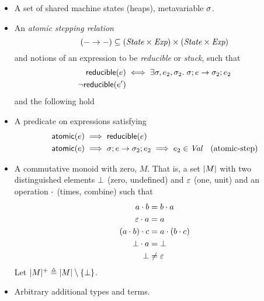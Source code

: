 \begin{itemize}
\item A set  of shared machine states (\eg heaps), metavariable $\sigma$.
\item An \emph{atomic stepping relation} \[
  (- \rightarrow -) \subseteq (\textit{State} \times \textit{Exp}) \times (\textit{State} \times \textit{Exp})
\]
and notions of an expression to be \emph{reducible} or \emph{stuck}, such that
\begin{align*}
  \textlog{reducible}(\expr) &\iff \Exists \state, \expr_2, \state_2. \cfg{\state}{\expr} \step \cfg{\state_2}{\expr_2} \\
   \lnot \textlog{reducible}(\expr')
\end{align*}
and the following hold

\item A predicate  on expressions satisfying
  \begin{align*}
   &\textsf{atomic}(e) \implies \textsf{reducible}(e) &\\
   &\textsf{atomic}(e) \implies {\sigma};{e} \rightarrow {\sigma_2};{e_2} \implies e_2 \in \textit{Val} &\mbox{(atomic-step)}
  \end{align*}


\item A commutative monoid with zero, $M$.
That is, a set $|M|$ with two distinguished elements $\bot$ (zero, undefined) and $\mathord{\varepsilon}$ (one, unit) and an operation $\mathbin{\cdot}$ (times, combine) such that
\begin{align*}
 a \mathbin{\cdot} b &= b \mathbin{\cdot} a \\
 \mathord{\varepsilon} \mathbin{\cdot} a &= a \\
 (a \mathbin{\cdot} b) \mathbin{\cdot} c &= a \mathbin{\cdot} (b \mathbin{\cdot} c) \\
 \bot \mathbin{\cdot} a &= \bot \\
 \bot &\neq \mathord{\varepsilon}
\end{align*}
Let $|M|^{+} \triangleq |M| \setminus \{\bot\}$.

\item Arbitrary additional types and terms.
\end{itemize}

